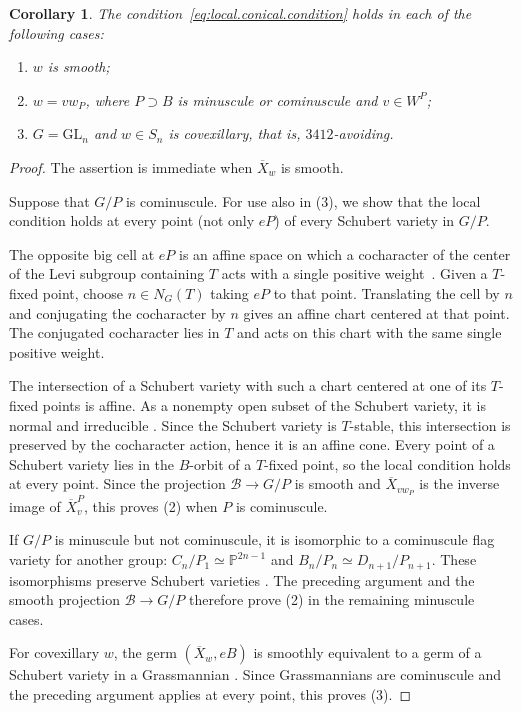 \documentclass[11pt]{amsart}
\numberwithin{equation}{section}
\newtheorem{corollary}[theorem]{Corollary}
\theoremstyle{definition}
\def\cB{\mathcal {B}}
\def\PP{\mathbb{P}}
\begin{document}
\begin{corollary}\label{cor:local.conical.classes}
The condition~\eqref{eq:local.conical.condition} holds in each of the
following cases:
\begin{enumerate}
\item $w$ is smooth;
\item $w=vw_P$, where $P\supset B$ is minuscule or cominuscule and $v\in W^P$;
\item $G=\mathrm{GL}_n$ and $w\in S_n$ is covexillary, that is, $3412$-avoiding.
\end{enumerate}
\end{corollary}

\begin{proof}
The assertion is immediate when $\overline X_w$ is smooth.

Suppose that $G/P$ is cominuscule.
For use also in (3), we show that the local condition holds at every point (not only $eP$) of every Schubert variety in $G/P$.

The opposite big cell at $eP$ is an affine space on which a cocharacter of the center of the Levi subgroup containing $T$ acts with a single positive weight~\cite[Proposition~2.9]{GK15}.
Given a $T$-fixed point, choose $n\in N_G(T)$ taking $eP$ to that point.
Translating the cell by $n$ and conjugating the cocharacter by $n$ gives an affine chart centered at that point.
The conjugated cocharacter lies in $T$ and acts on this chart with the same single positive weight.

The intersection of a Schubert variety with such a chart centered at one of its $T$-fixed points is affine.
As a nonempty open subset of the Schubert variety, it is normal and irreducible \cite{RR85}.
Since the Schubert variety is $T$-stable, this intersection is preserved by the cocharacter action, %
hence it is an affine cone.
Every point of a Schubert variety lies in the $B$-orbit of a $T$-fixed point, so the local condition holds at every point.
Since the projection $\cB\to G/P$ is smooth and $\overline X_{vw_P}$ is the inverse image of $\overline X_v^P$, this proves (2) when $P$ is cominuscule.

If $G/P$ is minuscule but not cominuscule, it is isomorphic to a cominuscule flag variety for another group:
$C_n/P_1\simeq\PP^{2n-1}$
and
$B_n/P_n\simeq D_{n+1}/P_{n+1}$.
These isomorphisms preserve Schubert varieties \cite[Remark~3.4]{Perrin07}. The preceding argument and the smooth projection $\cB\to G/P$ therefore prove (2) in the remaining minuscule cases.


For covexillary $w$, the germ $(\overline X_w,eB)$ is smoothly equivalent to a germ of a Schubert variety in a Grassmannian \cite[Section~5 and Theorem~7.1]{AIJK21}.
Since Grassmannians are cominuscule and the preceding argument applies at every point, this proves (3).
\end{proof}
\end{document}
